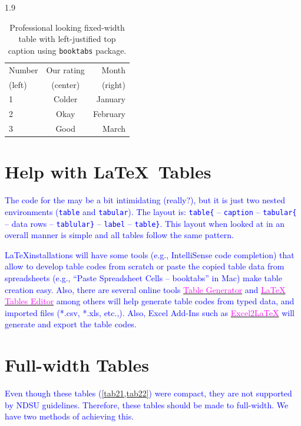 \documentclass[phd]{ndsu-thesis-2022}
\newcommand\myspacing{1.9} %
\newcommand\italk[1]{\textcolor{blue}{#1}}  %
\newcommand\vb[1]{\textcolor{blue}{\texttt{#1}}}%
\begin{document}
\begin{spacing}{\myspacing}
\begin{table}[h!]
\centering
\caption{Professional looking fixed-width table with left-justified top caption using \texttt{booktabs} package.}
\begin{tabular}{ l c r }
\toprule
Number & Our rating & Month \\
(left) & (center)   & (right)\\
\midrule
1 & Colder & January \\
2 & Okay   & February \\
3 & Good   & March\\
\bottomrule
\end{tabular}
\label{tab22}
\end{table}

\section{Help with \LaTeX\ Tables}
\italk{The code for the  may be a bit intimidating (really?), but it is just two nested environments (\vb{table} and \vb{tabular}). The layout is: \vb{table\{} -- \vb{caption} -- \vb{tabular\{} -- data rows -- \vb{tablular\}} -- \vb{label} -- \vb{table\}}. This layout when looked at in an overall manner is simple and all tables follow the same pattern.}  

\italk{\LaTeX installations will have some tools (e.g., IntelliSense code completion) that allow to develop table codes from scratch or paste the copied table data from spreadsheets (e.g., ``Paste Spreadsheet Cells -- booktabs'' in Mac) make table creation easy. Also, there are several online tools \href{https://www.tablesgenerator.com}{\textcolor{magenta}{Table Generator}} and \href{https://www.latex-tables.com}{\textcolor{magenta}{LaTeX Tables Editor}} among others will help generate table codes from typed data, and imported files (*.csv, *.xls, etc.,). Also, Excel Add-Ins such as \href{https://ctan.org/tex-archive/support/excel2latex?lang=en}{\textcolor{magenta}{Excel2\LaTeX}} will generate and export the table codes. 
}

\section{Full-width Tables}
\italk{Even though these tables (\cref{tab21,tab22}) were compact, they are not supported by NDSU guidelines. Therefore, these tables should be made to full-width. We have two methods of achieving this.}


\end{spacing}
\end{document}
